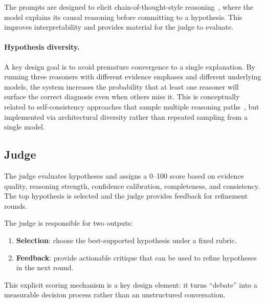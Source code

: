 The prompts are designed to elicit chain-of-thought-style
reasoning~\cite{wei2023chainofthoughtpromptingelicitsreasoning}, where the model explains its
causal reasoning before committing to a hypothesis. This improves interpretability and provides
material for the judge to evaluate.

\paragraph{Hypothesis diversity.}
A key design goal is to avoid premature convergence to a single explanation. By running three
reasoners with different evidence emphases and different underlying models, the system increases
the probability that at least one reasoner will surface the correct diagnosis even when others miss
it. This is conceptually related to self-consistency approaches that sample multiple reasoning
paths~\cite{wang2023selfconsistencyimproveschainthought}, but implemented via architectural
diversity rather than repeated sampling from a single model.

\subsection{Judge}
The judge evaluates hypotheses and assigns a 0--100 score based on evidence quality, reasoning
strength, confidence calibration, completeness, and consistency. The top hypothesis is selected
and the judge provides feedback for refinement rounds.

The judge is responsible for two outputs:
\begin{enumerate}
  \item \textbf{Selection}: choose the best-supported hypothesis under a fixed rubric.
  \item \textbf{Feedback}: provide actionable critique that can be used to refine hypotheses in
        the next round.
\end{enumerate}
This explicit scoring mechanism is a key design element: it turns ``debate'' into a measurable
decision process rather than an unstructured conversation.


